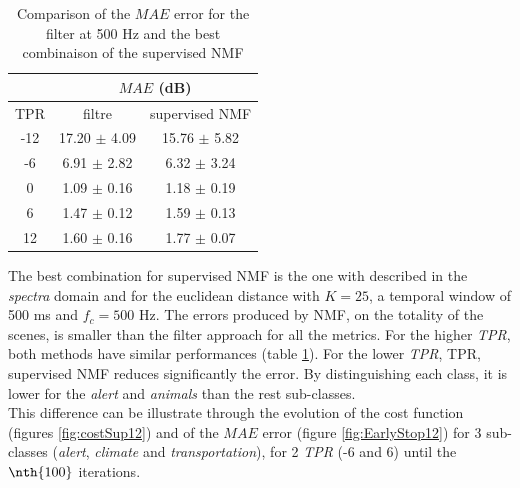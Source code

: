 \documentclass[twocolumn,a4paper,10pt]{article}
\begin{document}
\begin{table}[h]
\centering
\begin{tabular}{ccc}
    & \multicolumn{2}{c}{$MAE$ (dB)} \\ \hline
TPR & filtre & supervised NMF \\ \hline
 -12 & 17.20 $\pm$ 4.09 & 15.76 $\pm$ 5.82 \\ 
 -6 &  6.91 $\pm$ 2.82 & 6.32 $\pm$ 3.24\\ 
 0 & 1.09 $\pm$ 0.16 & 1.18 $\pm$ 0.19\\
  6 &  1.47 $\pm$ 0.12 & 1.59 $\pm$ 0.13\\ 
 12 &  1.60 $\pm$ 0.16 & 1.77 $\pm$ 0.07
\end{tabular}
\caption{Comparison of the $MAE$ error for the filter at 500 Hz and the best combinaison of the supervised NMF}
\label{tab:resultsComparison}
\end{table}


The best combination for supervised NMF is the one with described in the \textit{spectra} domain and for the euclidean distance with $K = 25$, a temporal window of 500 ms and $f_c = 500$ Hz. The errors produced by NMF, on the totality of the scenes, is smaller than the filter approach for all the metrics. For the higher \textit{TPR}, both methods have similar performances (table \ref{tab:resultsComparison}). For the lower \textit{TPR}, TPR, supervised NMF reduces significantly the error. By distinguishing each class, it is lower for the \textit{alert} and \textit{animals} than the rest sub-classes. \\

This difference can be illustrate through the evolution of the cost function (figures \ref{fig:costSup12}) and of the $MAE$ error (figure \ref{fig:EarlyStop12}) for 3 sub-classes (\textit{alert}, \textit{climate} and \textit{transportation}), for 2 \textit{TPR} (-6 and 6) until the $\nth {100}$ iterations.\\
\end{document}

